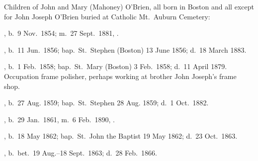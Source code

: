 \begin{KidsIntro}
	Children of John and Mary (Mahoney) O'Brien, all born in Boston and all except for John Joseph O'Brien buried at Catholic Mt.\ Auburn Cemetery:\cite{BillMcEvoy:3}
\end{KidsIntro}

\begin{Kids}
	, b.\ 9 Nov.\ 1854; m.\ 27 Sept.\ 1881, .
	
	, b.\ 11 Jun.\ 1856;\cite{Mary3OBrienBirth} bap.\ St.\ Stephen (Boston) 13 June 1856;\cite{Mary3OBrienBaptism} d.\ 18 March 1883.\cite{Mary3OBrienDeath}
	
	, b.\ 1 Feb.\ 1858;\cite{James3OBrienBirth} bap.\ St.\ Mary (Boston) 3 Feb.\ 1858;\cite{James3OBrienBaptism} d.\ 11 April 1879. Occupation frame polisher,\cite{James3OBrienDeath} perhaps working at brother John Joseph's frame shop.
	
	, b.\ 27 Aug. 1859;\cite{Ellen3OBrien2Baptism:1} bap.\ St.\ Stephen 28 Aug. 1859;\cite{Ellen3OBrien2Baptism:2} d.\ 1 Oct.\ 1882.\cite{Ellen3OBrien2Death}
	
	, b.\ 29 Jan.\ 1861, m.\ 6 Feb.\ 1890, .
	
	, b.\ 18 May 1862;\cite{Margaret3OBrienBaptism:1} bap.\ St.\ John the Baptist 19 May 1862;\cite{Margaret3OBrienBaptism:2} d.\ 23 Oct.\ 1863.\cite{Margaret3OBrienDeath}
	
	, b.\ bet.\ 19 Aug.--18 Sept.\ 1863;\cite{Anna3OBrienDeath:1} d.\ 28 Feb.\ 1866.\cite{Anna3OBrienDeath:2}
	
\end{Kids}